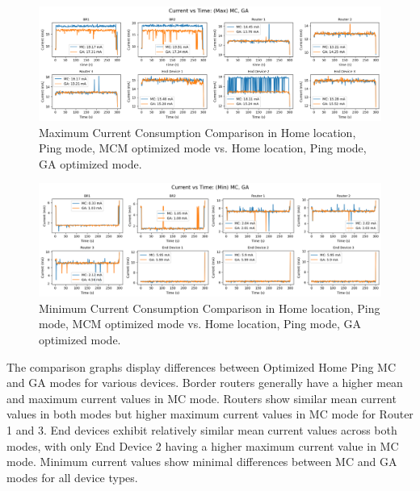 \begin{figure}[H]
  \centering
  \includegraphics[width=1\textwidth]{images/research_results/current_consumption_analysis/optimized/home/ping/ga/comparison/max_comparison_home_ping_mc_vs_home_ping_ga.png}
    \caption{Maximum Current Consumption Comparison in Home location, Ping mode, MCM optimized mode vs. Home location, Ping mode, GA optimized mode.}
    \label{fig:max_comparison_home_ping_mc_vs_home_ping_ga}
\end{figure}

\begin{figure}[H]
  \centering
  \includegraphics[width=1\textwidth]{images/research_results/current_consumption_analysis/optimized/home/ping/ga/comparison/min_comparison_home_ping_mc_vs_home_ping_ga.png}
    \caption{Minimum Current Consumption Comparison in Home location, Ping mode, MCM optimized mode vs. Home location, Ping mode, GA optimized mode.}
    \label{fig:min_comparison_home_ping_mc_vs_home_ping_ga}
\end{figure}

The comparison graphs display differences between Optimized Home Ping MC and GA modes for various devices. Border routers generally have a higher mean and maximum current values in MC mode. Routers show similar mean current values in both modes but higher maximum current values in MC mode for Router 1 and 3. End devices exhibit relatively similar mean current values across both modes, with only End Device 2 having a higher maximum current value in MC mode. Minimum current values show minimal differences between MC and GA modes for all device types.

